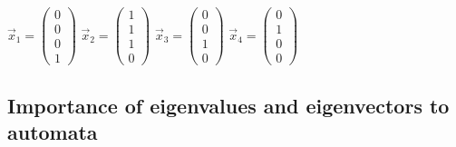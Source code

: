 \documentclass[12pt]{scrreprt}
\begin{document}
  \begin{center}
  $\vec{x}_1 = \begin{pmatrix}0\\ 0 \\ 0 \\ 1 \end{pmatrix}$
  $\vec{x}_2 = \begin{pmatrix}1\\ 1 \\ 1 \\ 0 \end{pmatrix}$
  $\vec{x}_3 = \begin{pmatrix}0\\ 0 \\ 1 \\ 0 \end{pmatrix}$
  $\vec{x}_4 = \begin{pmatrix}0\\ 1 \\ 0 \\ 0 \end{pmatrix}$
  \end{center}

\subsection{Importance of eigenvalues and eigenvectors to automata}
\end{document}
